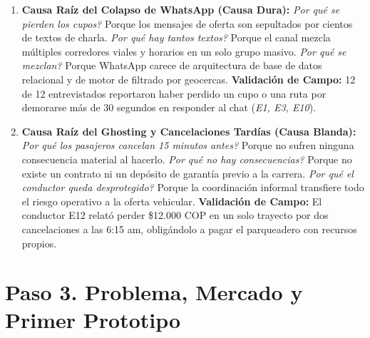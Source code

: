 \documentclass[11pt,a4paper]{article}
\begin{document}
\begin{enumerate}[leftmargin=*]
    \item \textbf{Causa Ra\'iz del Colapso de WhatsApp (Causa Dura):}  
    \textit{\textquestiondown Por qu\'e se pierden los cupos?} Porque los mensajes de oferta son sepultados por cientos de textos de charla.  
    \textit{\textquestiondown Por qu\'e hay tantos textos?} Porque el canal mezcla m\'ultiples corredores viales y horarios en un solo grupo masivo.  
    \textit{\textquestiondown Por qu\'e se mezclan?} Porque WhatsApp carece de arquitectura de base de datos relacional y de motor de filtrado por geocercas.  
    \textbf{Validaci\'on de Campo:} 12 de 12 entrevistados reportaron haber perdido un cupo o una ruta por demorarse m\'as de 30 segundos en responder al chat (\textit{E1, E3, E10}).

    \item \textbf{Causa Ra\'iz del Ghosting y Cancelaciones Tard\'ias (Causa Blanda):}  
    \textit{\textquestiondown Por qu\'e los pasajeros cancelan 15 minutos antes?} Porque no sufren ninguna consecuencia material al hacerlo.  
    \textit{\textquestiondown Por qu\'e no hay consecuencias?} Porque no existe un contrato ni un dep\'osito de garant\'ia previo a la carrera.  
    \textit{\textquestiondown Por qu\'e el conductor queda desprotegido?} Porque la coordinaci\'on informal transfiere todo el riesgo operativo a la oferta vehicular.  
    \textbf{Validaci\'on de Campo:} El conductor E12 relat\'o perder \$12.000 COP en un solo trayecto por dos cancelaciones a las 6:15 am, oblig\'andolo a pagar el parqueadero con recursos propios.
\end{enumerate}

\vspace{0.2cm}

\section{Paso 3. Problema, Mercado y Primer Prototipo}
\end{document}
